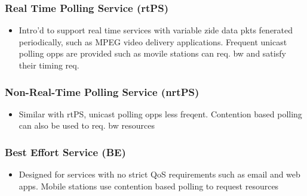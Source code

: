 \subsubsection{Real Time Polling Service (rtPS)}
\begin{itemize}
	\item Intro'd to support real time services with variable zide data pkts
		fenerated periodically, such as MPEG video delivery
		applications. Frequent unicast polling opps are provided such as
		movile stations can req. bw and satisfy their timing req.
\end{itemize}
\subsubsection{Non-Real-Time Polling Service (nrtPS)}
\begin{itemize}
	\item Similar with rtPS, unicast polling opps less freqent. Contention
		based polling can also be used to req. bw resources
\end{itemize}
\subsubsection{Best Effort Service (BE)}
\begin{itemize}
	\item Designed for services with no strict QoS requirements such as
		email and web apps. Mobile stations use contention based polling
		to request resources
\end{itemize}
